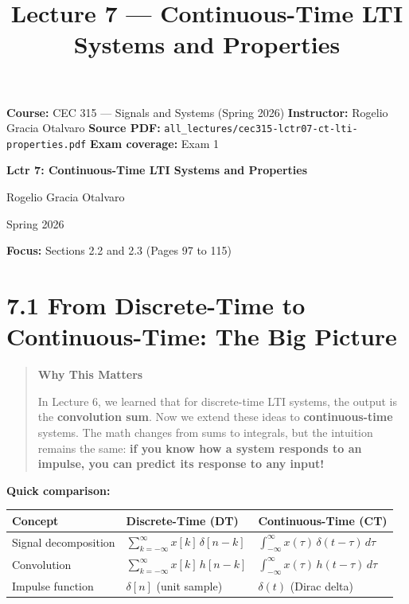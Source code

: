 \documentclass[11pt]{article}
\title{Lecture 7 — Continuous-Time LTI Systems and Properties}
\author{}
\date{}
\begin{document}
\maketitle

\textbf{Course:} CEC 315 — Signals and Systems (Spring 2026)
\textbf{Instructor:} Rogelio Gracia Otalvaro
\textbf{Source PDF:} \texttt{all\_lectures/cec315-lctr07-ct-lti-properties.pdf}
\textbf{Exam coverage:} Exam 1

\textbf{Lctr 7: Continuous-Time LTI Systems and Properties}

Rogelio Gracia Otalvaro

Spring 2026

\textbf{Focus:} Sections 2.2 and 2.3 (Pages 97 to 115)

\section*{7.1 From Discrete-Time to Continuous-Time: The Big Picture}

\begin{quote}
\textbf{Why This Matters}

In Lecture 6, we learned that for discrete-time LTI systems, the output is the \textbf{convolution sum}. Now we extend these ideas to \textbf{continuous-time} systems. The math changes from sums to integrals, but the intuition remains the same: \textbf{if you know how a system responds to an impulse, you can predict its response to any input!}
\end{quote}

\textbf{Quick comparison:}

\begin{center}
\begin{tabular}{|l|l|l|}
\hline
\textbf{Concept} & \textbf{Discrete-Time (DT)} & \textbf{Continuous-Time (CT)} \\
\hline
Signal decomposition & $\displaystyle \sum_{k=-\infty}^{\infty} x[k]\,\delta[n-k]$ & $\displaystyle \int_{-\infty}^{\infty} x(\tau)\,\delta(t-\tau)\,d\tau$ \\
\hline
Convolution & $\displaystyle \sum_{k=-\infty}^{\infty} x[k]\,h[n-k]$ & $\displaystyle \int_{-\infty}^{\infty} x(\tau)\,h(t-\tau)\,d\tau$ \\
\hline
Impulse function & $\delta[n]$ (unit sample) & $\delta(t)$ (Dirac delta) \\
\hline
\end{tabular}
\end{center}
\end{document}

